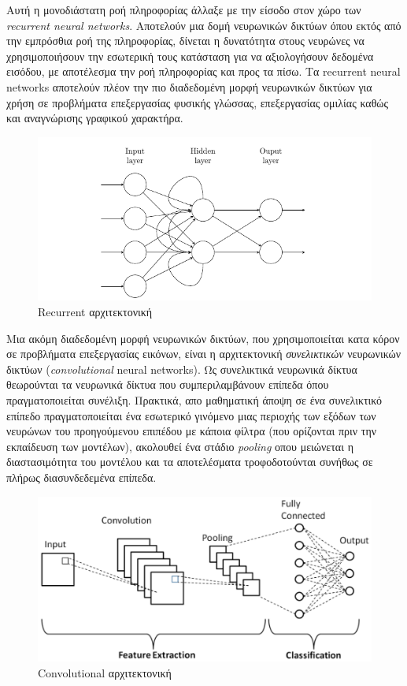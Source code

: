 Αυτή η μονοδιάστατη ροή πληροφορίας άλλαξε με την είσοδο στον χώρο των \textit{recurrent neural networks}. Αποτελούν μια δομή νευρωνικών δικτύων όπου εκτός από την εμπρόσθια ροή της πληροφορίας, δίνεται η δυνατότητα στους νευρώνες να χρησιμοποιήσουν την εσωτερική τους κατάσταση για να αξιολογήσουν δεδομένα εισόδου, με αποτέλεσμα την ροή πληροφορίας και προς τα πίσω. Τα recurrent neural networks αποτελούν πλέον την πιο διαδεδομένη μορφή νευρωνικών δικτύων για χρήση σε προβλήματα επεξεργασίας φυσικής γλώσσας, επεξεργασίας ομιλίας καθώς και αναγνώρισης γραφικού χαρακτήρα.

\medskip
\begin{figure}[h]
  \centering
  \includegraphics[scale=0.65]{images/recurrent.png}
  \caption{Recurrent αρχιτεκτονική}
  \label{fig:recurrent}
\end{figure}

\medskip
Μια ακόμη διαδεδομένη μορφή νευρωνικών δικτύων, που χρησιμοποιείται κατα κόρον σε προβλήματα επεξεργασίας εικόνων, είναι η αρχιτεκτονική \textit{συνελικτικών} νευρωνικών δικτύων (\textit{convolutional} neural networks). Ως συνελικτικά νευρωνικά δίκτυα θεωρούνται τα νευρωνικά δίκτυα που συμπεριλαμβάνουν επίπεδα όπου πραγματοποιείται συνέλιξη. Πρακτικά, απο μαθηματική άποψη σε ένα συνελικτικό επίπεδο πραγματοποιείται ένα εσωτερικό γινόμενο μιας περιοχής των εξόδων των νευρώνων του προηγούμενου επιπέδου με κάποια φίλτρα (που ορίζονται πριν την εκπαίδευση των μοντέλων), ακολουθεί ένα στάδιο \textit{pooling} οπου μειώνεται η διαστασιμότητα του μοντέλου και τα αποτελέσματα τροφοδοτούνται συνήθως σε πλήρως διασυνδεδεμένα επίπεδα.

\medskip
\begin{figure}[h]
  \centering
  \includegraphics[scale=1.2]{images/cnn.png}
  \caption{Convolutional αρχιτεκτονική}
  \label{fig:cnn}
\end{figure}

